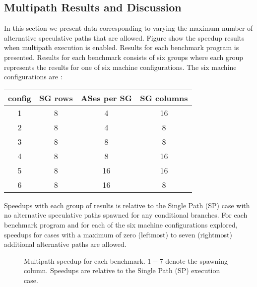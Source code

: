 \documentclass[10pt,dvips]{article}
\begin{document}
\subsection{Multipath Results and Discussion}
%
In this section we present data corresponding to varying the
maximum number of alternative speculative paths that are allowed.
Figure show the speedup results
when multipath execution is enabled.  Results for
each benchmark program is presented.  Results for each benchmark 
consists of six groups where each group represents the results
for one of six machine configurations.
The six machine configurations are :

\begin{tabular}{|c|c|c|c|}
\hline 
config&
SG rows&
ASes per SG&
SG columns\\
\hline
\hline 
1&
8&
4&
16\\
\hline 
2&
8&
4&
8\\
\hline 
3&
8&
8&
8\\
\hline 
4&
8&
8&
16\\
\hline 
5&
8&
16&
16\\
\hline 
6&
8&
16&
8\\
\hline
\end{tabular}

Speedups with each group of results is relative to the
Single Path (SP) case with no alternative speculative paths spawned
for any conditional branches.  For each benchmark program and
for each of the six machine configurations explored, speedups
for cases with a maximum
of zero (leftmost) to seven (rightmost) additional alternative 
paths are allowed.

\begin{figure}
\vspace{0.2 in}
\setlength{\epsfxsize}{14cm}%
\centerline{}
\caption{ Multipath speedup for each benchmark.  $1-7$ denote the
spawning column. 
Speedups are relative to the Single Path (SP) execution case.}
\label{figall}
\end{figure}

\end{document}
